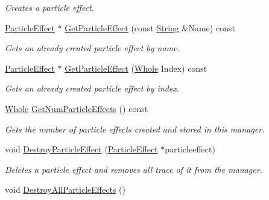 \begin{DoxyCompactItemize}
\begin{DoxyCompactList}\small\item\em Creates a particle effect. \item\end{DoxyCompactList}\item 
\hyperlink{classphys_1_1ParticleEffect}{ParticleEffect} $\ast$ \hyperlink{classphys_1_1SceneManager_af1f8d6b77b1088dea72685719ff6936f}{GetParticleEffect} (const \hyperlink{namespacephys_aa03900411993de7fbfec4789bc1d392e}{String} \&Name) const 
\begin{DoxyCompactList}\small\item\em Gets an already created particle effect by name. \item\end{DoxyCompactList}\item 
\hyperlink{classphys_1_1ParticleEffect}{ParticleEffect} $\ast$ \hyperlink{classphys_1_1SceneManager_acfe014153bbda04b181959774536aec5}{GetParticleEffect} (\hyperlink{namespacephys_a460f6bc24c8dd347b05e0366ae34f34a}{Whole} Index) const 
\begin{DoxyCompactList}\small\item\em Gets an already created particle effect by index. \item\end{DoxyCompactList}\item 
\hyperlink{namespacephys_a460f6bc24c8dd347b05e0366ae34f34a}{Whole} \hyperlink{classphys_1_1SceneManager_aad3e20c92eef52372671450704a2ac51}{GetNumParticleEffects} () const 
\begin{DoxyCompactList}\small\item\em Gets the number of particle effects created and stored in this manager. \item\end{DoxyCompactList}\item 
void \hyperlink{classphys_1_1SceneManager_addce8f82a6758db345568dbd4a88f5b9}{DestroyParticleEffect} (\hyperlink{classphys_1_1ParticleEffect}{ParticleEffect} $\ast$particleeffect)
\begin{DoxyCompactList}\small\item\em Deletes a particle effect and removes all trace of it from the manager. \item\end{DoxyCompactList}\item 
\hypertarget{classphys_1_1SceneManager_ac70441dd536d4b9be2c2143148b75420}{
void \hyperlink{classphys_1_1SceneManager_ac70441dd536d4b9be2c2143148b75420}{DestroyAllParticleEffects} ()}
\label{dd/da8/classphys_1_1SceneManager_ac70441dd536d4b9be2c2143148b75420}


\end{DoxyCompactItemize}

